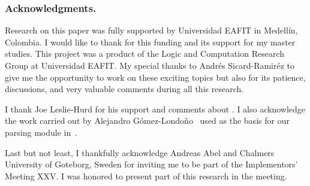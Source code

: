 \documentclass[../main.tex]{subfiles}
\begin{document}

\subsubsection*{Acknowledgments.}

Research on this paper was fully supported by Universidad EAFIT in Medellín,
Colombia. I would like to thank for this funding and its support for
my master studies.
This project was a product of the Logic and Computation
Research Group at Universidad EAFIT.
My special thanks to Andrés Sicard-Ramiréz to give me the opportunity
to work on these exciting topics but also for its patience, discussions,
and very valuable comments during all this research.

I thank Joe Leslie-Hurd for his support and comments about \Metis.
I also acknowledge the work carried out by Alejandro
G\'omez-Londo\~no~\cite{Gomez-Londono2015} used as the basis
for our \TSTP parsing module in~\cite{Athena}.

Last but not least, I thankfully acknowledge
Andreas Abel and Chalmers University of Goteborg, Sweden for
inviting me to be part of the \Agda Implementors’ Meeting XXV.
I was honored to present part of this research in the meeting.
\end{document}
